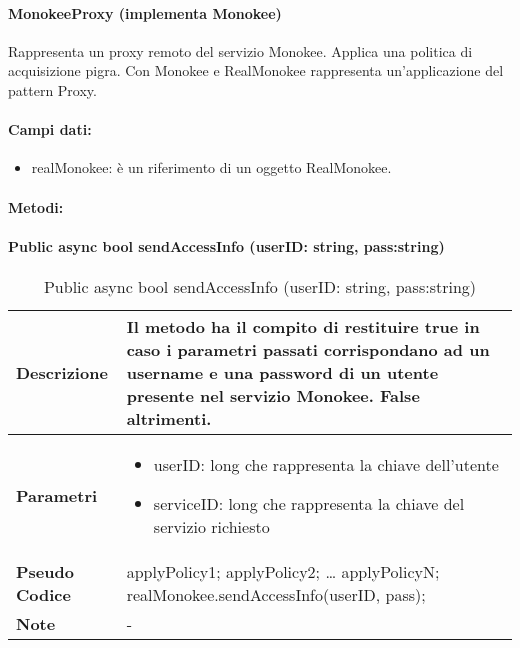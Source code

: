 \paragraph{MonokeeProxy (implementa Monokee)}
Rappresenta un proxy remoto del servizio Monokee. Applica una politica di acquisizione pigra. Con Monokee e RealMonokee rappresenta un’applicazione del pattern Proxy.
\paragraph{Campi dati:}
\begin{itemize}
    \item realMonokee: è un riferimento di un oggetto RealMonokee.
\end{itemize}

\paragraph{Metodi:}

\paragraph{Public async bool sendAccessInfo (userID: string, pass:string)}
\begin{center}
    \begin{longtable}{|p{3cm}|p{9cm}|}%
    \caption{Public async bool sendAccessInfo (userID: string, pass:string)}
    \endfirsthead
    \endhead
    \hline
    \textbf{Descrizione} & Il metodo ha il compito di restituire true in caso i parametri passati corrispondano ad un username e una password di un utente presente nel servizio Monokee. False altrimenti.\\
    \hline
    \textbf{Parametri} &      
    \begin{itemize}
        \item userID: long che rappresenta la chiave dell’utente
        \item serviceID: long che rappresenta la chiave del servizio richiesto
    \end{itemize}
    \\
    \hline
    \textbf{Pseudo Codice} & 
    applyPolicy1;\newline
    applyPolicy2;\newline
    … \newline
    applyPolicyN;\newline
    realMonokee.sendAccessInfo(userID, pass);\newline
    \\
    \hline
    \textbf{Note} & 
    -
    \\
    \hline
    \end{longtable}
    \end{center}



